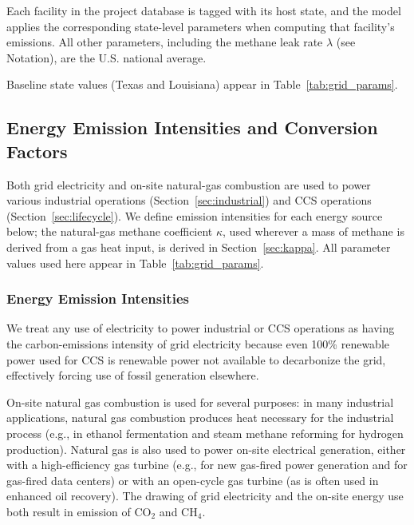 \documentclass[11pt]{article}
\newcommand{\cotwo}{\ensuremath{\mathrm{CO_2}}}
\newcommand{\chfour}{\ensuremath{\mathrm{CH_4}}}
\begin{document}
Each facility in the project database is tagged with its host state, and the model applies the corresponding state-level parameters when computing that facility's emissions. All other parameters, including the methane leak rate $\lambda$ (see Notation), are the U.S. national average.

Baseline state values (Texas and Louisiana) appear in Table~\ref{tab:grid_params}.

\subsection{Energy Emission Intensities and Conversion Factors}
\label{sec:energy_params}

Both grid electricity and on-site natural-gas combustion are used to power various industrial operations (Section~\ref{sec:industrial}) and CCS operations (Section~\ref{sec:lifecycle}). We define emission intensities for each energy source below; the natural-gas methane coefficient $\kappa$, used wherever a mass of methane is derived from a gas heat input, is derived in Section~\ref{sec:kappa}. All parameter values used here appear in Table~\ref{tab:grid_params}.

\subsubsection{Energy Emission Intensities}
\label{sec:energy}

We treat any use of electricity to power industrial or CCS operations as having the carbon-emissions intensity of grid electricity because even 100\% renewable power used for CCS is renewable power not available to decarbonize the grid, effectively forcing use of fossil generation elsewhere.

On-site natural gas combustion is used for several purposes: in many industrial applications, natural gas combustion produces heat necessary for the industrial process (e.g., in ethanol fermentation and steam methane reforming for hydrogen production). Natural gas is also used to power on-site electrical generation, either with a high-efficiency gas turbine (e.g., for new gas-fired power generation and for gas-fired data centers) or with an open-cycle gas turbine (as is often used in enhanced oil recovery). The drawing of grid electricity and the on-site energy use both result in emission of \cotwo{} and \chfour{}.
\end{document}
